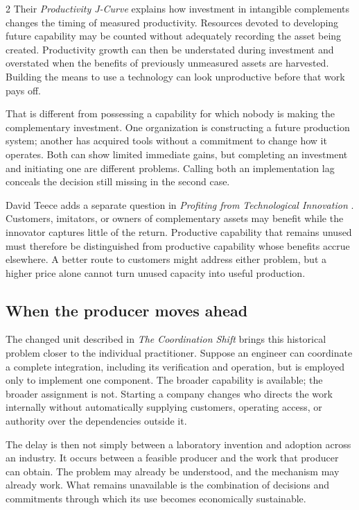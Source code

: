 \begin{multicols}{2}
Their \emph{Productivity J-Curve} \citep{brynjolfsson2021jcurve}
explains how investment in intangible complements changes the timing of
measured productivity. Resources devoted to developing future capability
may be counted without adequately recording the asset being created.
Productivity growth can then be understated during investment and
overstated when the benefits of previously unmeasured assets are
harvested. Building the means to use a technology can look unproductive
before that work pays off.

That is different from possessing a capability for which nobody is
making the complementary investment. One organization is constructing a
future production system; another has acquired tools without a
commitment to change how it operates. Both can show limited immediate
gains, but completing an investment and initiating one are different
problems. Calling both an implementation lag conceals the decision still
missing in the second case.

David Teece adds a separate question in \emph{Profiting from
Technological Innovation} \citep{teece1986innovation}. Customers,
imitators, or owners of complementary assets may benefit while the
innovator captures little of the return. Productive capability that
remains unused must therefore be distinguished from productive
capability whose benefits accrue elsewhere. A better route to customers
might address either problem, but a higher price alone cannot turn
unused capacity into useful production.

\columnbreak

\subsection{When the producer moves
ahead}\label{when-the-producer-moves-ahead}

The changed unit described in \emph{The Coordination Shift} brings this
historical problem closer to the individual practitioner. Suppose an
engineer can coordinate a complete integration, including its
verification and operation, but is employed only to implement one
component. The broader capability is available; the broader assignment
is not. Starting a company changes who directs the work internally
without automatically supplying customers, operating access, or
authority over the dependencies outside it.

The delay is then not simply between a laboratory invention and adoption
across an industry. It occurs between a feasible producer and the work
that producer can obtain. The problem may already be understood, and the
mechanism may already work. What remains unavailable is the combination
of decisions and commitments through which its use becomes economically
sustainable.


\end{multicols}
